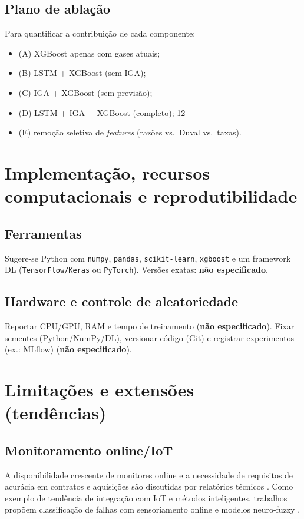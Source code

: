 \subsection{Plano de ablação}
Para quantificar a contribuição de cada componente:
\begin{itemize}
\item (A) XGBoost apenas com gases atuais;
\item (B) LSTM + XGBoost (sem IGA);
\item (C) IGA + XGBoost (sem previsão);
\item (D) LSTM + IGA + XGBoost (completo);
12\item (E) remoção seletiva de \textit{features} (razões vs.\
Duval vs.\ taxas).
\end{itemize}

\section{Implementação, recursos computacionais e reprodutibilidade}
\subsection{Ferramentas}
Sugere-se Python com \texttt{numpy}, \texttt{pandas}, \texttt{scikit-learn},
\texttt{xgboost} e um framework DL (\texttt{TensorFlow/Keras} ou
\texttt{PyTorch}).
Versões exatas: \textbf{não especificado}.

\subsection{Hardware e controle de aleatoriedade}
Reportar CPU/GPU, RAM e tempo de treinamento (\textbf{não especificado}).
Fixar sementes (Python/NumPy/DL), versionar código (Git) e registrar
experimentos (ex.: MLflow) (\textbf{não especificado}).

\section{Limitações e extensões (tendências)}
\subsection{Monitoramento online/IoT}
A disponibilidade crescente de monitores online e a necessidade de requisitos
de acurácia em contratos e aquisições são discutidas por
relatórios técnicos \cite{cigre_tb783_2019}.
Como exemplo de tendência de integração com IoT e métodos
inteligentes, trabalhos propõem classificação de falhas com
sensoriamento online e modelos neuro-fuzzy \cite{equbal2022_iot_anfis_enose}.

